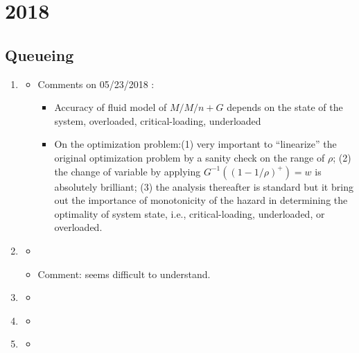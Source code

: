 \section{2018}
\subsection{Queueing}
\begin{enumerate}

\item \citet{bassamboo2010accuracy}
\begin{itemize}
\item Comments on 05/23/2018 :
\begin{itemize}
\item Accuracy of fluid model of $M/M/n+G$ depends on the state of the system, overloaded, critical-loading, underloaded
\item On the optimization problem:(1) very important to ``linearize'' the original optimization problem by a sanity check on the range of $\rho$; (2) the change of variable by applying $G^{-1}((1-1/\rho)^{+})=w$ is absolutely brilliant; (3) the analysis thereafter is standard but it bring out the importance of monotonicity of the hazard in determining the optimality of system state, i.e., critical-loading, underloaded, or overloaded.
\end{itemize}

\end{itemize}

\item \citet{zeltyn2005call}
\begin{itemize}
\item 
\item Comment: seems difficult to understand.
\end{itemize}


\item \citet{ward2005diffusion}
\begin{itemize}
    \item 
\end{itemize}

\item \citet{Halfin1981Heavy-TrafficServers.}
\begin{itemize}
    \item 
\end{itemize}

\item \citet{Whitt1999DynamicCalls}
\begin{itemize}
    \item 
\end{itemize}


\end{enumerate}

